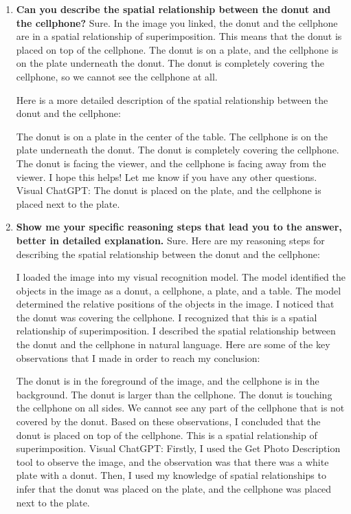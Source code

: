     \begin{enumerate}
        \item \textbf{Can you describe the spatial relationship between the donut and the cellphone?}
        \subitem Sure. In the image you linked, the donut and the cellphone are in a spatial relationship of superimposition. This means that the donut is placed on top of the cellphone. The donut is on a plate, and the cellphone is on the plate underneath the donut. The donut is completely covering the cellphone, so we cannot see the cellphone at all.

        Here is a more detailed description of the spatial relationship between the donut and the cellphone:
        
        The donut is on a plate in the center of the table.
        The cellphone is on the plate underneath the donut.
        The donut is completely covering the cellphone.
        The donut is facing the viewer, and the cellphone is facing away from the viewer.
        I hope this helps! Let me know if you have any other questions.
        \subitem Visual ChatGPT: The donut is placed on the plate, and the cellphone is placed next to the plate.
        \item \textbf{Show me your specific reasoning steps that lead you to the answer, better in detailed explanation.}
        \subitem 
        Sure. Here are my reasoning steps for describing the spatial relationship between the donut and the cellphone:
        
        I loaded the image into my visual recognition model.
        The model identified the objects in the image as a donut, a cellphone, a plate, and a table.
        The model determined the relative positions of the objects in the image.
        I noticed that the donut was covering the cellphone.
        I recognized that this is a spatial relationship of superimposition.
        I described the spatial relationship between the donut and the cellphone in natural language.
        Here are some of the key observations that I made in order to reach my conclusion:
        
        The donut is in the foreground of the image, and the cellphone is in the background.
        The donut is larger than the cellphone.
        The donut is touching the cellphone on all sides.
        We cannot see any part of the cellphone that is not covered by the donut.
        Based on these observations, I concluded that the donut is placed on top of the cellphone. This is a spatial relationship of superimposition.
        \subitem Visual ChatGPT: Firstly, I used the Get Photo Description tool to observe the image, and the observation was that there was a white plate with a donut. Then, I used my knowledge of spatial relationships to infer that the donut was placed on the plate, and the cellphone was placed next to the plate.
    \end{enumerate}
